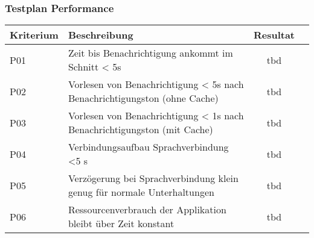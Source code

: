 \subsubsection{Testplan Performance}

\begin{table}[h]
    \centering
    \begin{tabular}{|l|p{11cm}|c|c|}
        \hline
        \textbf{Kriterium} & \textbf{Beschreibung}                                                                                                                                  & \textbf{Resultat} \\
        \hline
        P01         & Zeit bis Benachrichtigung ankommt im Schnitt < 5s & tbd\\
        \hline
        P02         & Vorlesen von Benachrichtigung < 5s nach Benachrichtigungston (ohne Cache) & tbd\\
        \hline
        P03         & Vorlesen von Benachrichtigung < 1s nach Benachrichtigungston (mit Cache) & tbd\\
        \hline
        P04         & Verbindungsaufbau Sprachverbindung <5 s  & tbd\\
        \hline
        P05         & Verzögerung bei Sprachverbindung klein genug für normale Unterhaltungen & tbd\\
        \hline
        P06         & Ressourcenverbrauch der Applikation bleibt über Zeit konstant & tbd\\
        \hline
    \end{tabular}\label{tab:testplan_performance}
\end{table}
\clearpage
